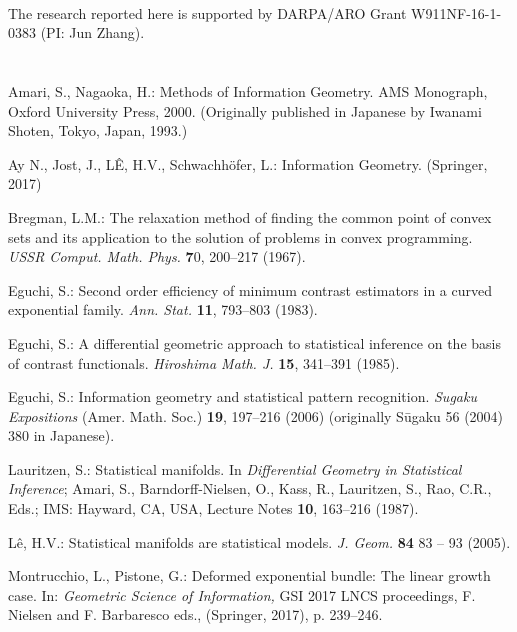 \documentclass[graybox]{svmult}
\begin{document}
\vspace{0.1cm}

 \\
The research reported here is supported by DARPA/ARO Grant W911NF-16-1-0383 (PI: Jun Zhang). 

\section*{}
\begin{thebibliography}{99}


Amari, S., Nagaoka, H.: Methods of Information Geometry. AMS Monograph, 
Oxford University Press, 2000. (Originally published in Japanese by Iwanami 
Shoten, Tokyo, Japan, 1993.) 

Ay N., Jost, J., L\^E, H.V., Schwachh\"ofer, L.:
Information Geometry. (Springer, 2017)

Bregman, L.M.: The relaxation method of finding the common point of convex sets 
and its application to the solution of problems in convex programming. {\em USSR 
Comput. Math. Phys.} {\bf 7}0, 200--217 (1967).

Eguchi, S.: Second order efficiency of minimum contrast estimators in a curved 
exponential family. {\em Ann. Stat.} {\bf 11}, 793--803 (1983).

Eguchi, S.: A differential geometric approach to statistical inference on the 
basis of contrast functionals. {\em Hiroshima Math. J.}  {\bf 15}, 
341--391 (1985).

Eguchi, S.:
Information geometry and statistical pattern recognition.
{\em Sugaku Expositions} (Amer. Math. Soc.) {\bf 19},  197--216 (2006) 
(originally S{\rm \=u}gaku 56 (2004) 380  in Japanese).

Lauritzen, S.: Statistical manifolds. In {\em Differential Geometry in 
Statistical Inference}; Amari, S., Barndorff-Nielsen, O., Kass, R., Lauritzen, 
S., Rao, C.R., Eds.; IMS: Hayward, CA, USA,  Lecture Notes {\bf 10},  
163--216 (1987).

L\^e, H.V.:
Statistical manifolds are statistical models.
{\em J. Geom.} {\bf  84}  83 -- 93 (2005).


 Montrucchio, L., Pistone, G.:
Deformed exponential bundle: The linear growth case.
In: {\em Geometric Science of Information,} 
GSI 2017 LNCS proceedings,
F. Nielsen and F. Barbaresco eds., (Springer, 2017), p. 239--246.


\end{thebibliography}
\end{document}
